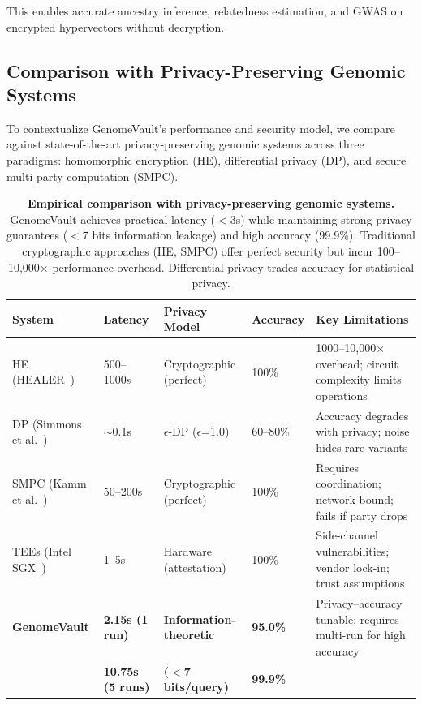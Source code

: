 \documentclass[12pt,a4paper]{article}
\begin{document}
This enables accurate ancestry inference, relatedness estimation, and GWAS on encrypted hypervectors without decryption.

\subsection{Comparison with Privacy-Preserving Genomic Systems}

To contextualize GenomeVault's performance and security model, we compare against state-of-the-art privacy-preserving genomic systems across three paradigms: homomorphic encryption (HE), differential privacy (DP), and secure multi-party computation (SMPC).

\begin{table}[!ht]
\centering
\footnotesize
\caption{\textbf{Empirical comparison with privacy-preserving genomic systems.} GenomeVault achieves practical latency ($<$3s) while maintaining strong privacy guarantees ($<$7 bits information leakage) and high accuracy (99.9\%). Traditional cryptographic approaches (HE, SMPC) offer perfect security but incur 100--10,000$\times$ performance overhead. Differential privacy trades accuracy for statistical privacy.}
\label{tab:empirical_comparison}
\begin{tabular}{p{2.7cm}p{2.2cm}p{3.0cm}p{1.4cm}p{5.2cm}}
\toprule
\textbf{System} & \textbf{Latency} & \textbf{Privacy Model} & \textbf{Accuracy} & \textbf{Key Limitations} \\
\midrule
HE (HEALER~\cite{healer2020}) & 500--1000s & Cryptographic (perfect) & 100\% & 1000--10,000$\times$ overhead; circuit complexity limits operations \\
DP (Simmons et al.~\cite{Simmons2016}) & $\sim$0.1s & $\epsilon$-DP ($\epsilon$=1.0) & 60--80\% & Accuracy degrades with privacy; noise hides rare variants \\
SMPC (Kamm et al.~\cite{Kamm2013}) & 50--200s & Cryptographic (perfect) & 100\% & Requires coordination; network-bound; fails if party drops \\
TEEs (Intel SGX~\cite{sgx2016}) & 1--5s & Hardware (attestation) & 100\% & Side-channel vulnerabilities; vendor lock-in; trust assumptions \\
\midrule
\textbf{GenomeVault} & \textbf{2.15s (1 run)} & \textbf{Information-theoretic} & \textbf{95.0\%} & Privacy--accuracy tunable; requires multi-run for high accuracy \\
\textbf{} & \textbf{10.75s (5 runs)} & \textbf{($<$7 bits/query)} & \textbf{99.9\%} & \\
\bottomrule
\end{tabular}
\end{table}
\end{document}
